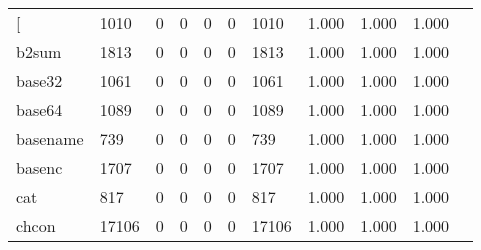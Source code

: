 \begin{longtable}{lp{1.10cm}p{1.10cm}p{1.10cm}p{1.10cm}p{1.10cm}p{1.10cm}p{1.10cm}p{1.10cm}p{1.10cm}p{1.10cm}}
\bottomrule
\endlastfoot
{[}         &                   1010 &                                  0 &                                 0 &                                0 &                                 0 &                            1010 &                          1.000 &                                 1.000 &                               1.000 \\
b2sum     &                   1813 &                                  0 &                                 0 &                                0 &                                 0 &                            1813 &                          1.000 &                                 1.000 &                               1.000 \\
base32    &                   1061 &                                  0 &                                 0 &                                0 &                                 0 &                            1061 &                          1.000 &                                 1.000 &                               1.000 \\
base64    &                   1089 &                                  0 &                                 0 &                                0 &                                 0 &                            1089 &                          1.000 &                                 1.000 &                               1.000 \\
basename  &                    739 &                                  0 &                                 0 &                                0 &                                 0 &                             739 &                          1.000 &                                 1.000 &                               1.000 \\
basenc    &                   1707 &                                  0 &                                 0 &                                0 &                                 0 &                            1707 &                          1.000 &                                 1.000 &                               1.000 \\
cat       &                    817 &                                  0 &                                 0 &                                0 &                                 0 &                             817 &                          1.000 &                                 1.000 &                               1.000 \\
chcon     &                  17106 &                                  0 &                                 0 &                                0 &                                 0 &                           17106 &                          1.000 &                                 1.000 &                               1.000 \\

\end{longtable}
